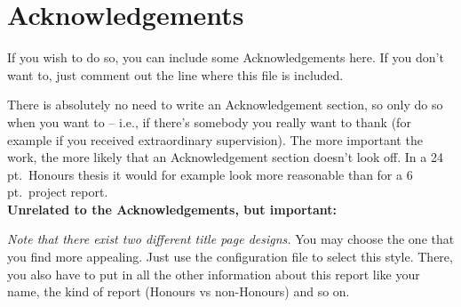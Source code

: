 \chapter*{Acknowledgements}

If you wish to do so, you can include some Acknowledgements here. If you don't want to, just comment out the line where this file is included.

There is absolutely no need to write an Acknowledgement section, so only do so when you want to -- i.e., if there's somebody you really want to thank (for example if you received extraordinary supervision). The more important the work, the more likely that an Acknowledgement section doesn't look off. In a 24 pt.\ Honours thesis it would for example look more reasonable than for a 6 pt.\ project report.\\

\textbf{Unrelated to the Acknowledgements, but important:}

\emph{Note that there exist two different title page designs.} You may choose the one that you find more appealing. Just use the configuration file to select this style. There, you also have to put in all the other information about this report like your name, the kind of report (Honours vs non-Honours) and so on.
